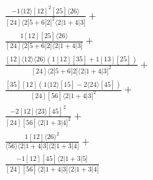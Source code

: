 \documentclass[varwidth, border=5pt]{standalone}
\begin{document}
\begin{my}
$\begin{gathered}
\scriptscriptstyle\frac{-1⟨12⟩[12]^2[25]⟨26⟩}{[24]⟨2|5+6|2]^2⟨2|1+4|3]}+\\
\scriptscriptstyle\frac{1[12][25]⟨26⟩}{[24]⟨2|5+6|2]⟨2|1+4|3]}+\\
\scriptscriptstyle\frac{[12]⟨12⟩⟨26⟩(1[12][35]+1[13][25])}{[24]⟨2|5+6|2]⟨2|1+4|3]^2}+\\
\scriptscriptstyle\frac{[35][12](1⟨12⟩[15]-2⟨24⟩[45])}{[24][56]⟨2|1+4|3]^2}+\\
\scriptscriptstyle\frac{-2[12]⟨23⟩[45]^2}{[24][56]⟨2|1+3|4]^2}+\\
\scriptscriptstyle\frac{1[12]⟨26⟩^2}{⟨56⟩⟨2|1+4|3]⟨2|1+3|4]}+\\
\scriptscriptstyle\frac{-1[12][45]⟨2|1+3|5]}{[24][56]⟨2|1+4|3]⟨2|1+3|4]}\phantom{+}
\end{gathered}$
\end{my}
\end{document}
